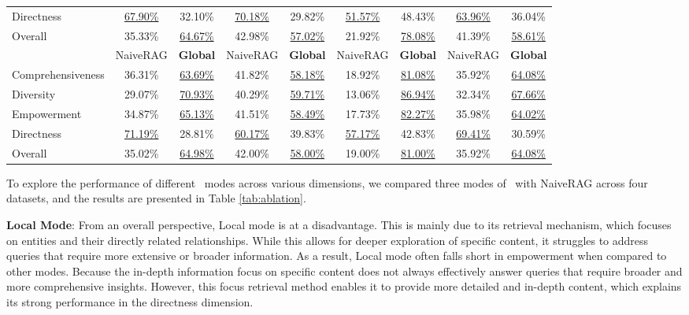 \begin{table}[h]
{\begin{tabular}{@{}lcccccccc@{}}
Directness             & \underline{67.90\%}      & 32.10\%     & \underline{70.18\%}      & 29.82\%     & \underline{51.57\%}      & 48.43\%     & \underline{63.96\%}      & 36.04\%     \\
Overall                & 35.33\%      & \underline{64.67\%}     & 42.98\%      & \underline{57.02\%}     & 21.92\%      & \underline{78.08\%}     & 41.39\%      & \underline{58.61\%}     \\
\cmidrule(lr){2-3} \cmidrule(lr){4-5} \cmidrule(lr){6-7} \cmidrule(lr){8-9}
                      & NaiveRAG & \textbf{Global} & NaiveRAG & \textbf{Global} & NaiveRAG & \textbf{Global} & NaiveRAG & \textbf{Global} \\
\midrule
Comprehensiveness      & 36.31\%      & \underline{63.69\%}     & 41.82\%      & \underline{58.18\%}     & 18.92\%      & \underline{81.08\%}     & 35.92\%      & \underline{64.08\%}     \\
Diversity              & 29.07\%      & \underline{70.93\%}     & 40.29\%      & \underline{59.71\%}     & 13.06\%      & \underline{86.94\%}     & 32.34\%      & \underline{67.66\%}     \\
Empowerment            & 34.87\%      & \underline{65.13\%}     & 41.51\%      & \underline{58.49\%}     & 17.73\%      & \underline{82.27\%}     & 35.98\%      & \underline{64.02\%}     \\
Directness             & \underline{71.19\%}      & 28.81\%     & \underline{60.17\%}      & 39.83\%     & \underline{57.17\%}      & 42.83\%     & \underline{69.41\%}      & 30.59\%     \\
Overall                & 35.02\%      & \underline{64.98\%}     & 42.00\%      & \underline{58.00\%}     & 19.00\%      & \underline{81.00\%}     & 35.92\%      & \underline{64.08\%}     \\
\bottomrule
\end{tabular}
}
\end{table}

To explore the performance of different \model\ modes across various dimensions, we compared three modes of \model\ with NaiveRAG across four datasets, and the results are presented in Table \ref{tab:ablation}. 

\textbf{Local Mode}: From an overall perspective, Local mode is at a disadvantage. This is mainly due to its retrieval mechanism, which focuses on entities and their directly related relationships. While this allows for deeper exploration of specific content, it struggles to address queries that require more extensive or broader information. As a result, Local mode often falls short in empowerment when compared to other modes. Because the in-depth information focus on specific content does not always effectively answer queries that require broader and more comprehensive insights. However, this focus retrieval method enables it to provide more detailed and in-depth content, which explains its strong performance in the directness dimension.

